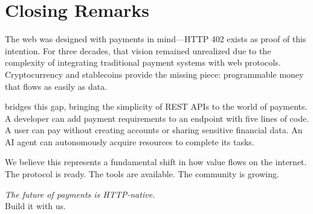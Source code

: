 \section{Closing Remarks}
\label{sec:closing}

The web was designed with payments in mind---HTTP 402 exists as proof of this intention. For three decades, that vision remained unrealized due to the complexity of integrating traditional payment systems with web protocols. Cryptocurrency and stablecoins provide the missing piece: programmable money that flows as easily as data.

\tprotocol{} bridges this gap, bringing the simplicity of REST APIs to the world of payments. A developer can add payment requirements to an endpoint with five lines of code. A user can pay without creating accounts or sharing sensitive financial data. An AI agent can autonomously acquire resources to complete its tasks.

We believe this represents a fundamental shift in how value flows on the internet. The protocol is ready. The tools are available. The community is growing.

\vspace{2em}

\begin{center}
\large\textit{The future of payments is HTTP-native.}\\[1em]
\normalsize Build it with us.
\end{center}

